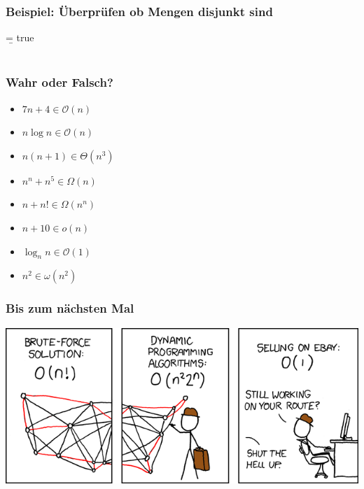 \begin{frame}
	\frametitle{Beispiel: Überprüfen ob Mengen disjunkt sind}
	\begin{algorithm}[H]
		\b = true\\
		\Return{\b}\\
	\end{algorithm}
\end{frame}


\begin{frame}
	\frametitle{Wahr oder Falsch?}
	\begin{itemize}
		\item {$7n + 4 \in \mathcal{O}(n)$}
		\item {\only<3->{\color{red}}$n \log{n} \in \mathcal{O}(n)$}
		\item {$n(n+1) \in \Theta(n^3)$}
		\item {$n^n + n^5 \in \Omega(n)$}
		\item {\only<6->{\color{red}}$n + n! \in \Omega(n^n)$}
		\item {$n + 10 \in o(n)$}
		\item {$\log_n{n} \in \mathcal{O}(1)$}
		\item {$n^2 \in \omega(n^2)$}
	\end{itemize}
\end{frame}
\begin{frame}
	\frametitle{Bis zum nächsten Mal}
	\includegraphics[width=\textwidth]{images/travelling_salesman_problem}
\end{frame}



